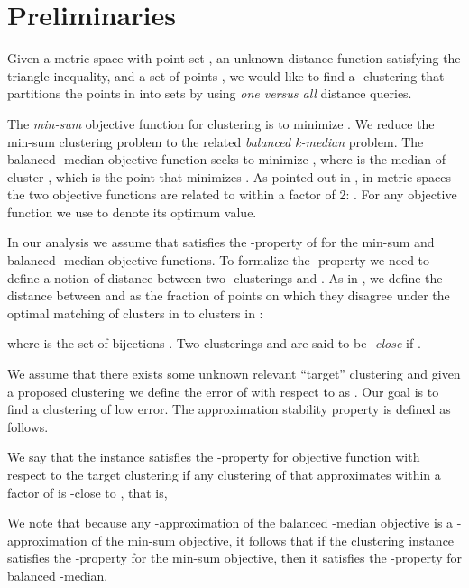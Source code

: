 \documentclass{llncs} \usepackage{algorithm}
\begin{document}
\section{Preliminaries}

Given a metric space  with point set , an unknown distance function
 satisfying the triangle inequality, and a set of points , we
would like to find a -clustering  that partitions the points in  into
 sets  by using \emph{one versus all} distance
queries.

The \emph{min-sum} objective function for clustering is to minimize \linebreak .  We reduce the min-sum clustering problem to the related \emph{balanced k-median} problem.  The balanced -median objective function seeks to minimize , where  is the median of cluster , which is the point  that minimizes .  As pointed out in \cite{bcr}, in metric spaces the two objective functions are related to within a factor of 2: .  For any objective function  we use  to denote its optimum value.

In our analysis we assume that  satisfies the -property of \cite{bbg} for the min-sum and balanced -median objective functions.  To formalize the -property we need to define a notion of distance
between two -clusterings  and
. As in \cite{bbg}, we define the
distance between  and  as the fraction of points on which they disagree
under the optimal matching of clusters in  to clusters in :

where  is the set of bijections .  Two clusterings  and  are said to be \emph{-close}
if .

We assume that there exists some unknown relevant ``target'' clustering  and given a proposed clustering  we define the error of  with respect to  as . Our goal is to find a clustering of low error.  The  approximation stability property is defined as follows.
\begin{definition}
We say that the instance  satisfies the -property for objective function  with respect to the target clustering  if any
clustering of  that approximates  within a factor of  is
-close to , that is,

\end{definition}

We note that because any -approximation of the balanced -median objective is a -approximation of the min-sum objective, it follows that if the clustering instance satisfies the -property for the min-sum objective, then it satisfies the -property for balanced -median.
\end{document}
